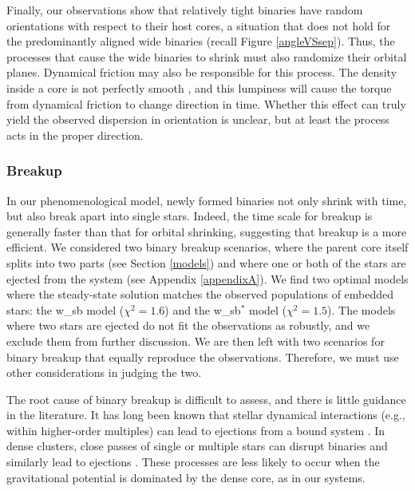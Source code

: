 \documentclass[usenatbib,a4paper]{mnras}
\begin{document}
Finally, our observations show that relatively tight binaries have random orientations with respect to their host cores, a situation that does not hold for the predominantly aligned wide binaries (recall Figure \ref{angleVSsep}). Thus, the processes that cause the wide binaries to shrink must also randomize their orbital planes.  Dynamical friction may also be responsible for this process.  The density inside a core is not perfectly smooth \citep[e.g.,][]{Looney07, Stutz09, Tobin10}, and this lumpiness will cause the torque from dynamical friction to change direction in time.  Whether this effect can truly yield the observed dispersion in orientation is unclear, but at least the process acts in the proper direction.

\subsubsection{Breakup}\label{break}

In our phenomenological model, newly formed binaries not only shrink with time, but also break apart into single stars.  Indeed, the time scale for breakup is generally faster than that for orbital shrinking, suggesting that breakup is a more efficient.  We considered two binary breakup scenarios, where the parent core itself splits into two parts (see Section \ref{models}) and where one or both of the stars are ejected from the system (see Appendix \ref{appendixA}).  We find two optimal models where the steady-state solution matches the observed populations of embedded stars: the w\_sb model ($\chi^2 = 1.6$) and the w\_sb$^{\ast}$ model ($\chi^2 = 1.5$).  The models where two stars are ejected do not fit the observations as robustly, and we exclude them from further discussion.  We are then left with two scenarios for binary breakup that equally reproduce the observations.    Therefore, we must use other considerations in judging the two.
 
The root cause of binary breakup is difficult to assess, and there is little guidance in the literature.  It has long been known that stellar dynamical interactions (e.g., within higher-order multiples) can lead to ejections from a bound system \citep[e.g.,][]{ReipurthClarke01, Reipurth14}.  In dense clusters, close passes of single or multiple stars can disrupt binaries and similarly lead to ejections \citep[e.g.,][]{Kroupa99, Parker09}.  These processes are less likely to occur when the gravitational potential is dominated by the dense core, as in our systems. 
\end{document}
